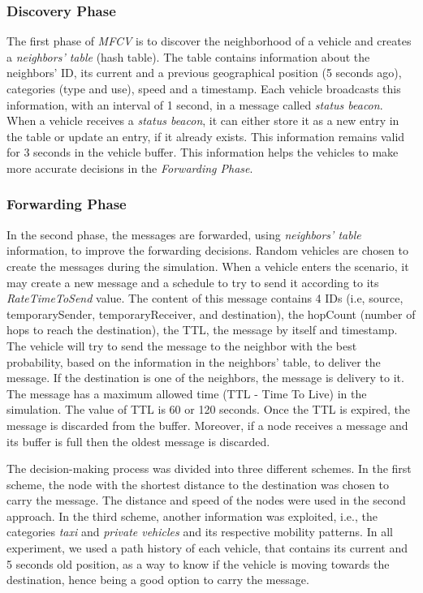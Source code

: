 \documentclass[letterpaper, 10 pt, conference]{ieeeconf}  %
\begin{document}
\subsubsection{Discovery Phase}

The first phase of \emph{MFCV} is to discover the neighborhood of a vehicle and creates a \emph{neighbors' table} (hash table). The table contains information about the neighbors' ID, its current and a previous geographical position (5 seconds ago), categories (type and use), speed and a timestamp. Each vehicle broadcasts this information, with an interval of 1 second, in a message called \emph{status beacon}. When a vehicle receives a \emph{status beacon}, it can either store it as a new entry in the table or update an entry, if it already exists. This information remains valid for 3 seconds in the vehicle buffer. This information helps the vehicles to make more accurate decisions in the \emph{Forwarding Phase}.

\subsubsection{Forwarding Phase}

In the second phase, the messages are forwarded, using \emph{neighbors' table} information, to improve the forwarding decisions. Random vehicles are chosen to create the messages during the simulation. When a vehicle enters the scenario, it may create a new message and a schedule to try to send it according to its \emph{RateTimeToSend} value. The content of this message contains 4 IDs (i.e, source, temporarySender, temporaryReceiver, and destination), the hopCount (number of hops to reach the destination), the TTL, the message by itself and timestamp. The vehicle will try to send the message to the neighbor with the best probability, based on the information in the neighbors' table, to deliver the message. If the destination is one of the neighbors, the message is delivery to it. The message has a maximum allowed time (TTL - Time To Live) in the simulation. The value of TTL is 60 or 120 seconds. Once the TTL is expired, the message is discarded from the buffer. Moreover, if a node receives a message and its buffer is full then the oldest message is discarded.

The decision-making process was divided into three different schemes. In the first scheme, the node with the shortest distance to the destination was chosen to carry the message. The distance and speed of the nodes were used in the second approach. In the third scheme, another information was exploited, i.e., the categories \emph{taxi} and \emph{private vehicles} and its respective mobility patterns. In all experiment, we used a path history of each vehicle, that contains its current and 5 seconds old position, as a way to know if the vehicle is moving towards the destination, hence being a good option to carry the message.
\end{document}
